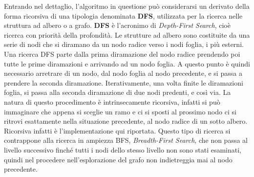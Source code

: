 \documentclass[12pt,a4paper,oneside]{book}
\begin{document}
		Entrando nel dettaglio, l'algoritmo in questione può considerarsi un derivato della forma ricorsiva di una tipologia denominata {\bf DFS}, utilizzata per la ricerca nelle struttura ad albero o a grafo. {\bf DFS} è l'acronimo di {\it Depth-First Search}, cioè ricerca con priorità della profondità. Le strutture ad albero sono costituite da una serie di nodi che si diramano da un nodo radice verso i nodi foglia, i più esterni. Una ricerca DFS parte dalla prima diramazione del nodo radice prendendo poi tutte le prime diramazioni e arrivando ad un nodo foglia. A questo punto è quindi necessario arretrare di un nodo, dal nodo foglia al nodo precedente, e si passa a prendere la seconda diramazione. Iterativamente, una volta finite le diramazioni foglia, si passa alla seconda diramazione di due nodi predenti, e così via. La natura di questo procedimento è intrinsecamente ricorsiva, infatti si può immaginare che appena si sceglie un ramo e ci si sposti al prossimo nodo ci si ritrovi esattamente nella situazione precedente, al nodo radice di un sotto albero. Ricorsiva infatti è l'implementazione qui riportata. Questo tipo di ricerca si contrappone alla ricerca in ampiezza BFS, {\it Breadth-First Search}, che non passa al livello successivo finché tutti i nodi dello stesso livello non sono stati esaminati, quindi nel procedere nell'esplorazione del grafo non indietreggia mai al nodo precedente. 
		
\end{document}
